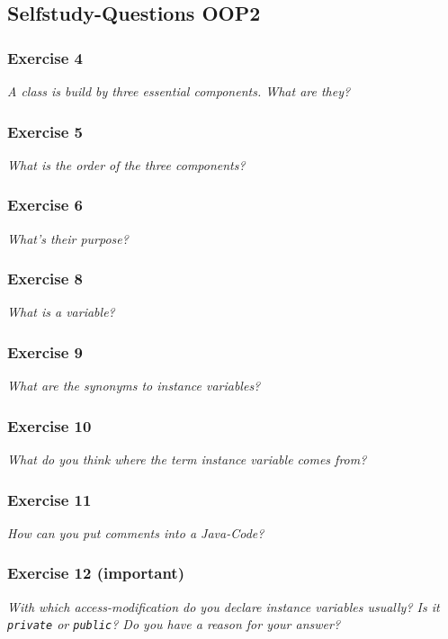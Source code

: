 \subsection{Selfstudy-Questions OOP2}
\subsubsection*{Exercise 4}
\textit{A class is build by three essential components. What are they?}\\

\subsubsection*{Exercise 5}
\textit{What is the order of the three components?}\\

\subsubsection*{Exercise 6}
\textit{What's their purpose?}\\

\subsubsection*{Exercise 8}
\textit{What is a variable?}\\

\subsubsection*{Exercise 9}
\textit{What are the synonyms to instance variables?}\\

\subsubsection*{Exercise 10}
\textit{What do you think where the term instance variable comes from?}\\

\subsubsection*{Exercise 11}
\textit{How can you put comments into a Java-Code?}\\

\subsubsection*{Exercise 12 (important)}
\textit{With which access-modification do you declare instance variables
	usually? Is it \lstinline{private} or \lstinline{public}? Do you
	have a reason for your answer?}\\

